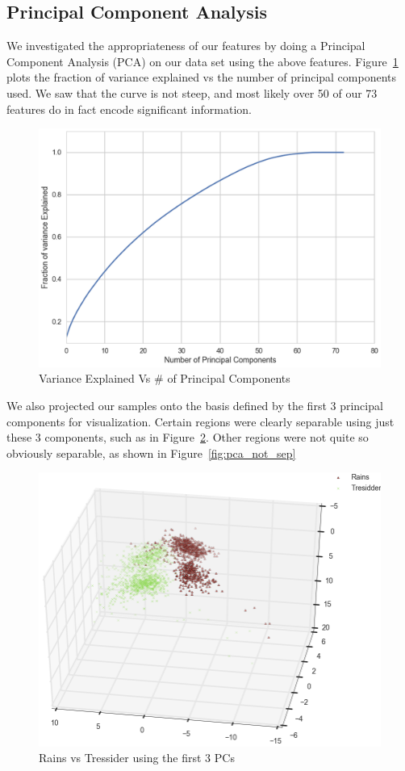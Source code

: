 \documentclass[journal]{IEEEtran}
\begin{document}
\subsection{Principal Component Analysis}
We investigated the appropriateness of our features by doing a Principal Component Analysis (PCA) on our data set using the above features. Figure~\ref{fig:pca_var} plots the fraction of variance explained vs the number of principal components used. We saw that the curve is not steep, and most likely over 50 of our 73 features do in fact encode significant information.

\begin{figure}[H]
\centering
\includegraphics[width=0.9\linewidth]{pca_var}
\caption{Variance Explained Vs \# of Principal Components}
\label{fig:pca_var}
\end{figure}

We also projected our samples onto the basis defined by the first 3 principal components for visualization. Certain regions were clearly separable using just these 3 components, such as in Figure~\ref{fig:pca_sep}. Other regions were not quite so obviously separable, as shown in Figure~\ref{fig:pca_not_sep}

\begin{figure}[H]
\centering
\includegraphics[width=0.9\linewidth]{pca_rains_tressider}
\caption{Rains vs Tressider using the first 3 PCs}
\label{fig:pca_sep}
\end{figure}
\end{document}
